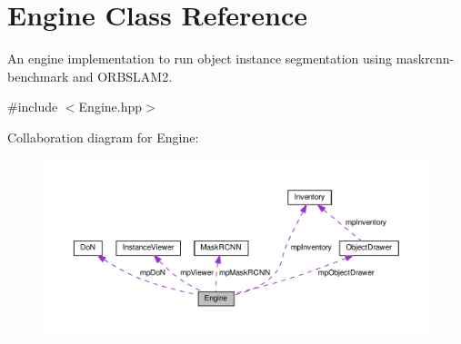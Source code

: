 \hypertarget{classEngine}{}\section{Engine Class Reference}
\label{classEngine}


An engine implementation to run object instance segmentation using maskrcnn-\/benchmark and O\+R\+B\+S\+L\+A\+M2.  




{\ttfamily \#include $<$Engine.\+hpp$>$}



Collaboration diagram for Engine\+:\nopagebreak
\begin{figure}[H]
\begin{center}
\leavevmode
\includegraphics[width=350pt]{classEngine__coll__graph}
\end{center}
\end{figure}

